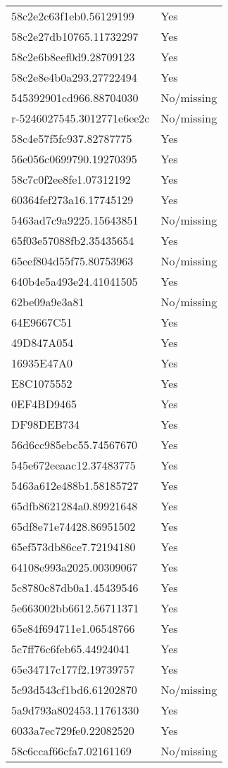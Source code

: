 \begin{tabular}{ll}
58c2e2c63f1eb0.56129199 & Yes \\
58c2e27db10765.11732297 & Yes \\
58c2e6b8eef0d9.28709123 & Yes \\
58c2e8e4b0a293.27722494 & Yes \\
545392901cd966.88704030 & No/missing \\
r-5246027545.3012771e6ee2c & No/missing \\
58c4e57f5fc937.82787775 & Yes \\
56e056c0699790.19270395 & Yes \\
58c7c0f2ee8fe1.07312192 & Yes \\
60364fef273a16.17745129 & Yes \\
5463ad7c9a9225.15643851 & No/missing \\
65f03e57088fb2.35435654 & Yes \\
65eef804d55f75.80753963 & No/missing \\
640b4e5a493e24.41041505 & Yes \\
62be09a9e3a81 & No/missing \\
64E9667C51 & Yes \\
49D847A054 & Yes \\
16935E47A0 & Yes \\
E8C1075552 & Yes \\
0EF4BD9465 & Yes \\
DF98DEB734 & Yes \\
56d6cc985ebc55.74567670 & Yes \\
545e672eeaac12.37483775 & Yes \\
5463a612e488b1.58185727 & Yes \\
65dfb8621284a0.89921648 & Yes \\
65df8e71e74428.86951502 & Yes \\
65ef573db86ce7.72194180 & Yes \\
64108e993a2025.00309067 & Yes \\
5c8780c87db0a1.45439546 & Yes \\
5e663002bb6612.56711371 & Yes \\
65e84f694711e1.06548766 & Yes \\
5c7ff76c6feb65.44924041 & Yes \\
65e34717c177f2.19739757 & Yes \\
5c93d543cf1bd6.61202870 & No/missing \\
5a9d793a802453.11761330 & Yes \\
6033a7ec729fe0.22082520 & Yes \\
58c6ccaf66cfa7.02161169 & No/missing \\

\end{tabular}

